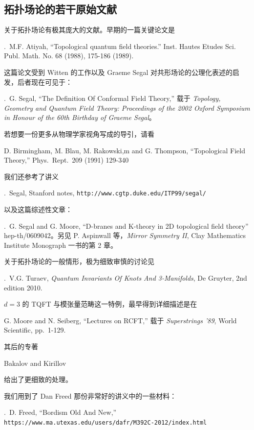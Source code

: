 \subsection{拓扑场论的若干原始文献} %

关于拓扑场论有极其庞大的文献。早期的一篇关键论文是

.\ M.F. Atiyah, ``Topological quantum field theories.'' Inst. Hautes Etudes Sci. Publ. Math. No. 68 (1988), 175-186 (1989).

这篇论文受到 Witten 的工作以及 Graeme Segal 对共形场论的公理化表述的启发，后者现在可见于：

.\ G. Segal, ``The Definition Of Conformal Field Theory,'' 载于 \emph{Topology, Geometry and Quantum Field Theory: Proceedings of the 2002 Oxford Symposium in Honour of the 60th Birthday of Graeme Segal}。

若想要一份更多从物理学家视角写成的导引，请看

\qquad D. Birmingham, M. Blau, M. Rakowski,m and G. Thompson, ``Topological Field Theory,'' Phys.\ Rept.\ 209 (1991) 129-340

我们还参考了讲义

.\ Segal, Stanford notes, \texttt{http://www.cgtp.duke.edu/ITP99/segal/}

以及这篇综述性文章：

.\ G. Segal and G. Moore, ``D-branes and K-theory in 2D topological field theory'' hep-th/0609042。另见 P. Aspinwall 等，\emph{Mirror Symmetry II}, Clay Mathematics Institute Monograph 一书的第 2 章。

关于拓扑场论的一般情形，极为细致审慎的讨论见

.\ V.G. Turaev, \emph{Quantum Invariants Of Knots And 3-Manifolds}, De Gruyter, 2nd edition 2010.

$d=3$ 的 TQFT 与模张量范畴这一特例，最早得到详细描述是在

\qquad G. Moore and N. Seiberg, ``Lectures on RCFT,'' 载于 \emph{Superstrings '89}, World Scientific, pp.\ 1-129.

其后的专著

\qquad Bakalov and Kirillov

给出了更细致的处理。

我们用到了 Dan Freed 那份非常好的讲义中的一些材料：

.\ D. Freed, ``Bordism Old And New,'' \texttt{https://www.ma.utexas.edu/users/dafr/M392C-2012/index.html}

